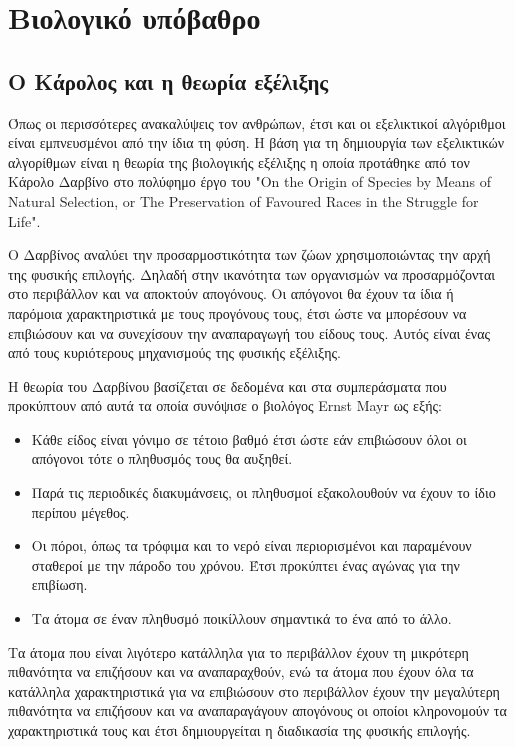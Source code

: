 \section{Βιολογικό υπόβαθρο}

\subsection{Ο Κάρολος και η θεωρία εξέλιξης}
Όπως οι περισσότερες ανακαλύψεις τον ανθρώπων, έτσι και οι εξελικτικοί αλγόριθμοι είναι εμπνευσμένοι από την ίδια τη φύση. Η βάση για τη δημιουργία των εξελικτικών αλγορίθμων είναι η θεωρία της βιολογικής εξέλιξης η οποία προτάθηκε από τον Κάρολο Δαρβίνο στο πολύφημο έργο του "On the Origin of Species by Means of Natural Selection, or The Preservation of Favoured Races in the Struggle for Life".

Ο Δαρβίνος αναλύει την προσαρμοστικότητα των ζώων χρησιμοποιώντας την αρχή της φυσικής επιλογής. Δηλαδή στην ικανότητα των οργανισμών να προσαρμόζονται στο περιβάλλον και να αποκτούν απογόνους. Οι απόγονοι θα έχουν τα ίδια ή παρόμοια χαρακτηριστικά με τους προγόνους τους, έτσι ώστε να μπορέσουν να επιβιώσουν και να συνεχίσουν την αναπαραγωγή του είδους τους. Αυτός είναι ένας από τους κυριότερους μηχανισμούς της φυσικής εξέλιξης.

Η θεωρία του Δαρβίνου βασίζεται σε δεδομένα και στα συμπεράσματα που προκύπτουν από αυτά τα οποία συνόψισε ο βιολόγος Ernst Mayr ως εξής:
\begin{itemize}
  \item Κάθε είδος είναι γόνιμο σε τέτοιο βαθμό έτσι ώστε εάν επιβιώσουν όλοι οι απόγονοι τότε ο πληθυσμός τους θα αυξηθεί.
  \item Παρά τις περιοδικές διακυμάνσεις, οι πληθυσμοί εξακολουθούν να έχουν το ίδιο περίπου μέγεθος.
  \item Οι πόροι, όπως τα τρόφιμα και το νερό είναι περιορισμένοι και παραμένουν σταθεροί με την πάροδο του χρόνου. Έτσι προκύπτει ένας αγώνας για την επιβίωση.
  \item Τα άτομα σε έναν πληθυσμό ποικίλλουν σημαντικά το ένα από το άλλο.
\end{itemize}

Τα άτομα που είναι λιγότερο κατάλληλα για το περιβάλλον έχουν τη μικρότερη πιθανότητα να επιζήσουν και να αναπαραχθούν, ενώ τα άτομα που έχουν όλα τα κατάλληλα χαρακτηριστικά για να επιβιώσουν στο περιβάλλον έχουν την μεγαλύτερη πιθανότητα να επιζήσουν και να αναπαραγάγουν απογόνους οι οποίοι κληρονομούν τα χαρακτηριστικά τους και έτσι δημιουργείται η διαδικασία της φυσικής επιλογής.

